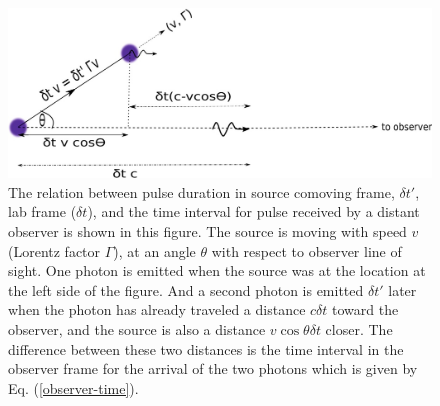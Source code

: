 \documentclass[12pt,a4paper]{article}
\begin{document}
\begin{figure}
\begin{center}
\includegraphics[width=12cm]{observed-pulse-duration.jpg}
\caption{The relation between pulse duration in source comoving frame, $\delta t'$, lab frame ($\delta t$), and the time interval for pulse received by a distant observer is shown in this figure. The source is moving with speed $v$ (Lorentz factor $\Gamma$), at an angle $\theta$ with respect to observer line of sight. One photon is emitted when the source was at the location at the left side of the figure. And a second photon is emitted $\delta t'$ later when the photon has already traveled a distance $c \delta t$ toward the observer, and the source is also a distance $v \cos\theta \delta t$ closer. The difference between these two distances is the time interval in the observer frame for the arrival of the two photons which is given by Eq. (\ref{observer-time}).
}
\label{FIG:photon-arrival}
\end{center}
\end{figure}
\end{document}
